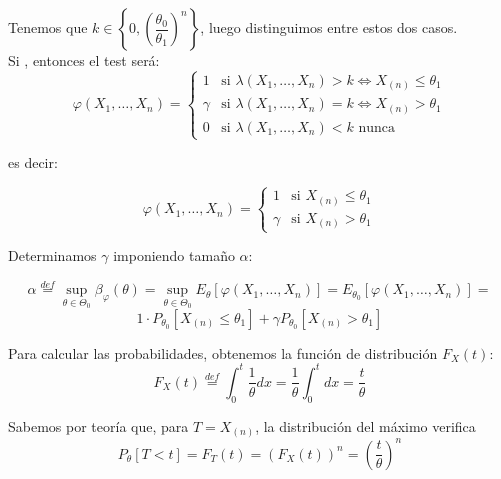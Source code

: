 \documentclass[12pt]{article}
\begin{document}
\begin{ejercicio}[1.75 puntos]
\begin{figure}[H]
        \end{figure}

        Tenemos que $k \in \left\{0, \left( \dfrac{\theta_0}{\theta_1} \right)^{n} \right\}$, luego distinguimos entre estos dos casos. \\

        Si , entonces el test será:
        $$\varphi(X_1, \ldots, X_n) = \begin{cases}
            1 &\text{si } \lambda(X_1, \ldots, X_n) > k \iff X_{(n)} \leq \theta_1 \\
            \gamma &\text{si } \lambda(X_1, \ldots, X_n) = k \iff X_{(n)} > \theta_1 \\
            0 &\text{si } \lambda(X_1, \ldots, X_n) < k \text{ nunca}
        \end{cases}$$

        es decir:

        $$\varphi(X_1, \ldots, X_n) = \begin{cases}
            1 &\text{si } X_{(n)} \leq \theta_1 \\
            \gamma &\text{si } X_{(n)} > \theta_1
        \end{cases}$$

        Determinamos $\gamma$ imponiendo tamaño $\alpha$:

        $$\alpha \stackrel{def} = \sup_{\theta \in \Theta_0} \beta_{\varphi}(\theta) =  \sup_{\theta \in \Theta_0} E_\theta[\varphi(X_1, \ldots, X_n)] = E_{\theta_0}[\varphi(X_1, \ldots, X_n)] = $$
        $$1 \cdot P_{\theta_0}[X_{(n)} \leq \theta_1] + \gamma P_{\theta_0}[X_{(n)} > \theta_1] $$

        Para calcular las probabilidades, obtenemos la función de distribución $F_X(t)$:
        $$F_X(t) \stackrel{def}{=} \int_{0}^{t} \dfrac{1}{\theta} dx = \dfrac{1}{\theta} \int_{0}^{t} dx = \dfrac{t}{\theta}$$

        Sabemos por teoría que, para $T = X_{(n)}$, la distribución del máximo verifica $$P_{\theta}[T<t] = F_T(t) = (F_X(t))^n = \left( \dfrac{t}{\theta} \right)^{n}$$


\end{ejercicio}
\end{document}
